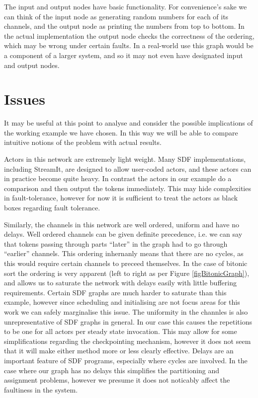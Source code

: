 The input and output nodes have basic functionality.
For convenience's sake we can think of the input node as generating random numbers for each of its channels, and the output node as printing the numbers from top to bottom.
In the actual implementation the output node checks the correctness of the ordering, which may be wrong under certain faults.
In a real-world use this graph would be a component of a larger system, and so it may not even have designated input and output nodes.

\section{Issues}

It may be useful at this point to analyse and consider the possible implications of the working example we have chosen.
In this way we will be able to compare intuitive notions of the problem with actual results.

Actors in this network are extremely light weight.
Many SDF implementations, including StreamIt, are designed to allow user-coded actors, and these actors can in practice become quite heavy.
In contrast the actors in our example do a comparison and then output the tokens immediately.
This may hide complexities in fault-tolerance, however for now it is sufficient to treat the actors as black boxes regarding fault tolerance.

Similarly, the channels in this network are well ordered, uniform and have no delays.
Well ordered channels can be given definite precedence, i.e. we can say that tokens passing through parts ``later'' in the graph had to go through ``earlier'' channels.
This ordering inhernanly means that there are no cycles, as this would require certain channels to preceed themselves.
In the case of bitonic sort the ordering is very apparent (left to right as per Figure \ref{figBitonicGraph}), and allows us to saturate the network with delays easily with little buffering requirements.
Certain SDF graphs are much harder to saturate than this example, however since scheduling and initialising are not focus areas for this work we can safely marginalise this issue.
The uniformity in the channles is also unrepresentative of SDF graphs in general.
In our case this causes the repetitions to be one for all actors per steady state invocation.
This may allow for some simplifications regarding the checkpointing mechanism, however it does not seem that it will make either method more or less clearly effective.
Delays are an important feature of SDF programs, especially where cycles are involved.
In the case where our graph has no delays this simplifies the partitioning and assignment problems, however we presume it does not noticably affect the faultiness in the system.

